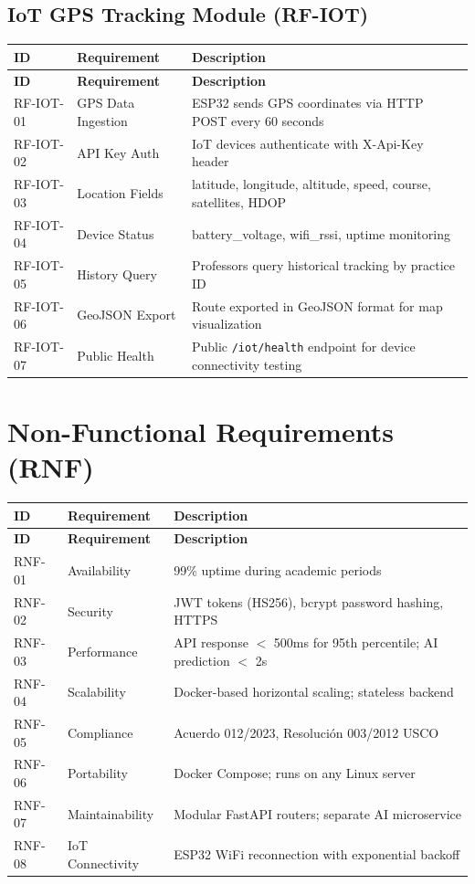 \documentclass[12pt,a4paper]{report}
\begin{document}
\subsection{IoT GPS Tracking Module (RF-IOT)}
\begin{longtable}{|p{2.5cm}|p{3.5cm}|p{7cm}|}
\hline
\textbf{ID} & \textbf{Requirement} & \textbf{Description} \\
\hline
\endfirsthead
\hline \textbf{ID} & \textbf{Requirement} & \textbf{Description} \\ \hline \endhead
RF-IOT-01 & GPS Data Ingestion & ESP32 sends GPS coordinates via HTTP POST every 60 seconds \\
\hline
RF-IOT-02 & API Key Auth & IoT devices authenticate with X-Api-Key header \\
\hline
RF-IOT-03 & Location Fields & latitude, longitude, altitude, speed, course, satellites, HDOP \\
\hline
RF-IOT-04 & Device Status & battery\_voltage, wifi\_rssi, uptime monitoring \\
\hline
RF-IOT-05 & History Query & Professors query historical tracking by practice ID \\
\hline
RF-IOT-06 & GeoJSON Export & Route exported in GeoJSON format for map visualization \\
\hline
RF-IOT-07 & Public Health & Public \texttt{/iot/health} endpoint for device connectivity testing \\
\hline
\end{longtable}

\section{Non-Functional Requirements (RNF)}

\begin{longtable}{|p{2.5cm}|p{3.5cm}|p{7cm}|}
\hline
\textbf{ID} & \textbf{Requirement} & \textbf{Description} \\
\hline
\endfirsthead
\hline \textbf{ID} & \textbf{Requirement} & \textbf{Description} \\ \hline \endhead
RNF-01 & Availability & 99\% uptime during academic periods \\
\hline
RNF-02 & Security & JWT tokens (HS256), bcrypt password hashing, HTTPS \\
\hline
RNF-03 & Performance & API response $<$ 500ms for 95th percentile; AI prediction $<$ 2s \\
\hline
RNF-04 & Scalability & Docker-based horizontal scaling; stateless backend \\
\hline
RNF-05 & Compliance & Acuerdo 012/2023, Resolución 003/2012 USCO \\
\hline
RNF-06 & Portability & Docker Compose; runs on any Linux server \\
\hline
RNF-07 & Maintainability & Modular FastAPI routers; separate AI microservice \\
\hline
RNF-08 & IoT Connectivity & ESP32 WiFi reconnection with exponential backoff \\
\hline
\end{longtable}
\end{document}

